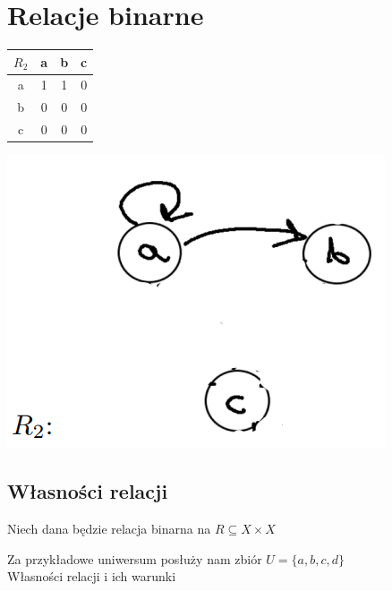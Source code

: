 \section{Relacje binarne}

\begin{center}
\begin{table}[h]
    \centering
    \begin{tabular}{|c|c|c|c|}
    \hline
    $R_2$ & a & b & c \\ \hline
    a & 1 & 1 & 0 \\ \hline
    b & 0 & 0 & 0 \\ \hline
    c & 0 & 0 & 0 \\ \hline
    \end{tabular}
\end{table}

\includegraphics[scale=0.5]{img/grafR2.png}
\end{center}

\subsection{Własności relacji}

Niech dana będzie relacja binarna na $ R \subseteq X \times X $

Za przykładowe uniwersum posłuży nam zbiór $U = \{ a, b, c, d \} $ \\

Własności relacji i ich warunki

